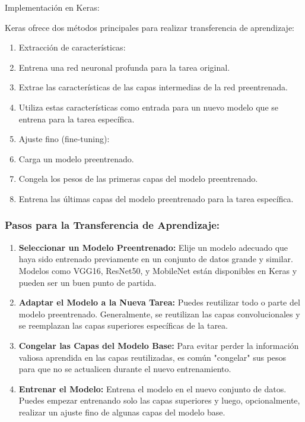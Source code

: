 \documentclass[11pt]{article}
\begin{document}
Implementación en Keras:

Keras ofrece dos métodos principales para realizar transferencia de
aprendizaje:

\begin{enumerate}
\item Extracción de características:

\item Entrena una red neuronal profunda para la tarea original.
\item Extrae las características de las capas intermedias de la red
preentrenada.
\item Utiliza estas características como entrada para un nuevo modelo que se
entrena para la tarea específica.

\item Ajuste fino (fine-tuning):

\item Carga un modelo preentrenado.
\item Congela los pesos de las primeras capas del modelo preentrenado.
\item Entrena las últimas capas del modelo preentrenado para la tarea
específica.
\end{enumerate}

\subsubsection{Pasos para la Transferencia de Aprendizaje:}
\label{sec:org025a010}
\begin{enumerate}
\item \textbf{Seleccionar un Modelo Preentrenado:} Elije un modelo adecuado que
haya sido entrenado previamente en un conjunto de datos grande y
similar. Modelos como VGG16, ResNet50, y MobileNet están disponibles
en Keras y pueden ser un buen punto de partida.

\item \textbf{Adaptar el Modelo a la Nueva Tarea:} Puedes reutilizar todo o parte
del modelo preentrenado. Generalmente, se reutilizan las capas
convolucionales y se reemplazan las capas superiores específicas de
la tarea.

\item \textbf{Congelar las Capas del Modelo Base:} Para evitar perder la
información valiosa aprendida en las capas reutilizadas, es común
"congelar" sus pesos para que no se actualicen durante el nuevo
entrenamiento.

\item \textbf{Entrenar el Modelo:} Entrena el modelo en el nuevo conjunto de
datos. Puedes empezar entrenando solo las capas superiores y luego,
opcionalmente, realizar un ajuste fino de algunas capas del modelo
base.
\end{enumerate}
\end{document}
